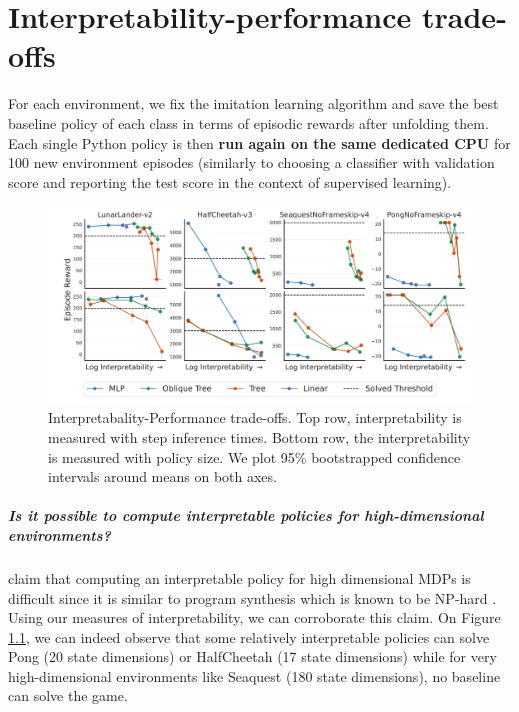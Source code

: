 \chapter{Interpretability-performance trade-offs}\label{sec:exps2}
For each environment, we fix the imitation learning algorithm and save the best baseline policy of each class in terms of episodic rewards after unfolding them.
Each single Python policy is then \textbf{run again on the same dedicated CPU} for 100 new environment episodes (similarly to choosing a classifier with validation score and reporting the test score in the context of supervised learning).

\begin{figure}
    \centering
    \includegraphics[trim={1.4cm 0 0 0},clip,width=1\textwidth]{images/images_part3/trade_off_select_combine_one_plot.pdf}
    \caption{Interpretabality-Performance trade-offs. Top row, interpretability is measured with step inference times. Bottom row, the interpretability is measured with policy size. We plot 95\% bootstrapped confidence intervals around means on both axes.}
    \label{fig:trade-off-summary}
\end{figure}

\paragraph{Is it possible to compute interpretable policies for high-dimensional environments?} \cite{glanois-survey} claim that computing an interpretable policy for high dimensional MDPs is difficult since it is similar to program synthesis which is known to be NP-hard \cite{program-synth}. Using our measures of interpretability, we can corroborate this claim. On Figure \ref{fig:trade-off-summary}, we can indeed observe that some relatively interpretable policies can solve Pong (20 state dimensions) or HalfCheetah (17 state dimensions) while for very high-dimensional environments like Seaquest (180 state dimensions), no baseline can solve the game.


